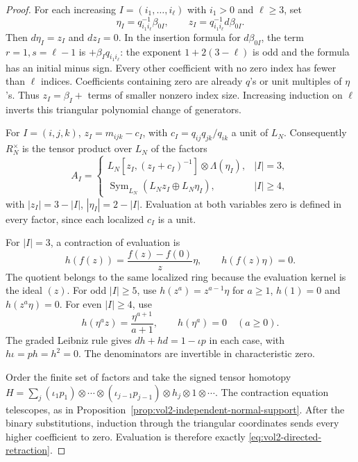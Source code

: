 \begin{proof}
For each increasing $I=(i_1,\ldots,i_\ell)$ with $i_1>0$
and $\ell\geq3$, set
\begin{equation}\label{eq:vol2-directed-contracting-pairs}
 \eta_I=q_{i_1i_\ell}^{-1}\beta_{0I},\qquad
 z_I=q_{i_1i_\ell}^{-1}d\beta_{0I}.
\end{equation}
Then $d\eta_I=z_I$ and $dz_I=0$.
In the insertion formula for $d\beta_{0I}$, the term
$r=1,s=\ell-1$ is $+\beta_Iq_{i_1i_\ell}$: the exponent
$1+2(3-\ell)$ is odd and the formula has an initial minus
sign. Every other coefficient with no zero index has fewer
than $\ell$ indices. Coefficients containing zero are
already $q$'s or unit multiples of $\eta$'s. Thus
$z_I=\beta_I+$ terms of smaller nonzero index size.
Increasing induction on $\ell$ inverts this triangular
polynomial change of generators.

For $I=(i,j,k)$,
$z_I=m_{ijk}-c_I$, with $c_I=q_{ij}q_{jk}/q_{ik}$ a
unit of $L_N$. Consequently $R_N^\times$ is the tensor
product over $L_N$ of the factors
\[
 A_I=
 \begin{cases}
 L_N[z_I,(z_I+c_I)^{-1}]\otimes\Lambda(\eta_I),&|I|=3,\\
 \operatorname{Sym}_{L_N}(L_Nz_I\oplus L_N\eta_I),&|I|\geq4,
 \end{cases}
\]
with $|z_I|=3-|I|$, $|\eta_I|=2-|I|$.
Evaluation at both variables zero is defined in every
factor, since each localized $c_I$ is a unit.

For $|I|=3$, a contraction of evaluation is
\[
 h(f(z))=\frac{f(z)-f(0)}z\eta,\qquad h(f(z)\eta)=0.
\]
The quotient belongs to the same localized ring because
the evaluation kernel is the ideal $(z)$.
For odd $|I|\geq5$, use
$h(z^a)=z^{a-1}\eta$ for $a\geq1$, $h(1)=0$ and
$h(z^a\eta)=0$. For even $|I|\geq4$, use
\[
 h(\eta^az)=\frac{\eta^{a+1}}{a+1},\qquad
 h(\eta^a)=0\quad(a\geq0).
\]
The graded Leibniz rule gives $dh+hd=1-\iota p$ in
each case, with $h\iota=ph=h^2=0$.
The denominators are invertible in characteristic zero.

Order the finite set of factors and take the signed
tensor homotopy
$H=\sum_j(\iota_1p_1)\otimes\cdots\otimes
(\iota_{j-1}p_{j-1})\otimes h_j\otimes1\otimes\cdots$.
The contraction equation telescopes, as in
Proposition~\ref{prop:vol2-independent-normal-support}.
After the binary substitutions, induction through the
triangular coordinates sends every higher coefficient
to zero. Evaluation is therefore exactly
\eqref{eq:vol2-directed-retraction}.
\end{proof}


